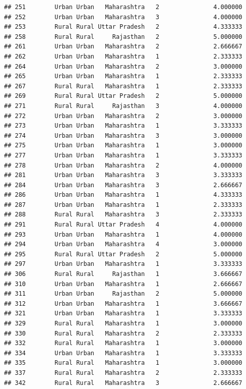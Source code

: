 \documentclass[
]{article}
\begin{document}
\begin{verbatim}
## 251        Urban Urban   Maharashtra   2               4.000000
## 252        Urban Urban   Maharashtra   3               4.000000
## 253        Rural Rural Uttar Pradesh   2               4.333333
## 258        Rural Rural     Rajasthan   2               5.000000
## 261        Urban Urban   Maharashtra   2               2.666667
## 262        Urban Urban   Maharashtra   1               2.333333
## 264        Urban Urban   Maharashtra   2               3.000000
## 265        Urban Urban   Maharashtra   1               2.333333
## 267        Rural Rural   Maharashtra   1               2.333333
## 269        Rural Rural Uttar Pradesh   2               5.000000
## 271        Rural Rural     Rajasthan   3               4.000000
## 272        Urban Urban   Maharashtra   2               3.000000
## 273        Urban Urban   Maharashtra   1               3.333333
## 274        Urban Urban   Maharashtra   3               3.000000
## 275        Urban Urban   Maharashtra   1               3.000000
## 277        Urban Urban   Maharashtra   1               3.333333
## 278        Urban Urban   Maharashtra   2               4.000000
## 281        Urban Urban   Maharashtra   3               3.333333
## 284        Urban Urban   Maharashtra   3               2.666667
## 286        Urban Urban   Maharashtra   1               4.333333
## 287        Urban Urban   Maharashtra   1               2.333333
## 288        Rural Rural   Maharashtra   3               2.333333
## 291        Rural Rural Uttar Pradesh   4               4.000000
## 293        Urban Urban   Maharashtra   1               4.000000
## 294        Urban Urban   Maharashtra   4               3.000000
## 295        Rural Rural Uttar Pradesh   2               5.000000
## 297        Urban Urban   Maharashtra   1               3.333333
## 306        Rural Rural     Rajasthan   1               3.666667
## 310        Urban Urban   Maharashtra   1               2.666667
## 311        Urban Urban     Rajasthan   2               5.000000
## 312        Urban Urban   Maharashtra   1               3.666667
## 321        Urban Urban   Maharashtra   1               3.333333
## 329        Rural Rural   Maharashtra   1               3.000000
## 330        Rural Rural   Maharashtra   2               2.333333
## 332        Rural Rural   Maharashtra   1               3.000000
## 334        Urban Urban   Maharashtra   1               3.333333
## 335        Rural Rural   Maharashtra   1               3.000000
## 337        Rural Rural   Maharashtra   2               2.333333
## 342        Rural Rural   Maharashtra   3               2.666667

\end{verbatim}
\end{document}
